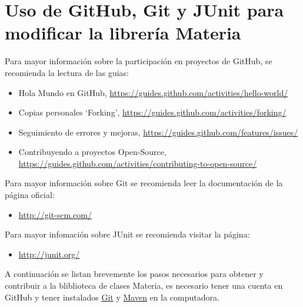 \chapter{Uso de GitHub, Git y JUnit para modificar la librería Materia}\label{chap:github}

Para mayor información sobre la participación en proyectos de GitHub, se recomienda la lectura de las guias:

\begin{itemize}\itemsep0ex
	\item Hola Mundo en GitHub, \url{https://guides.github.com/activities/hello-world/}
	\item Copias personales `Forking', \url{https://guides.github.com/activities/forking/}
	\item Seguimiento de errores y mejoras, \url{https://guides.github.com/features/issues/}
	\item Contribuyendo a proyectos Open-Source, \url{https://guides.github.com/activities/contributing-to-open-source/}
\end{itemize}

Para mayor información sobre Git se recomienda leer la documentación de la página oficial:
\begin{itemize}\itemsep0ex
	\item \url{http://git-scm.com/}
\end{itemize}

Para mayor infomación sobre JUnit se recomienda visitar la página:
\begin{itemize}\itemsep0ex
	\item \url{http://junit.org/}
\end{itemize}

	A continuación se listan brevemente los pasos necesarios para obtener y contribuir a la bliblioteca de clases Materia, es necesario tener una cuenta en GitHub y tener instalados \href{http://git-scm.com/}{Git} y \href{http://maven.apache.org/download.cgi}{Maven} en la computadora.

